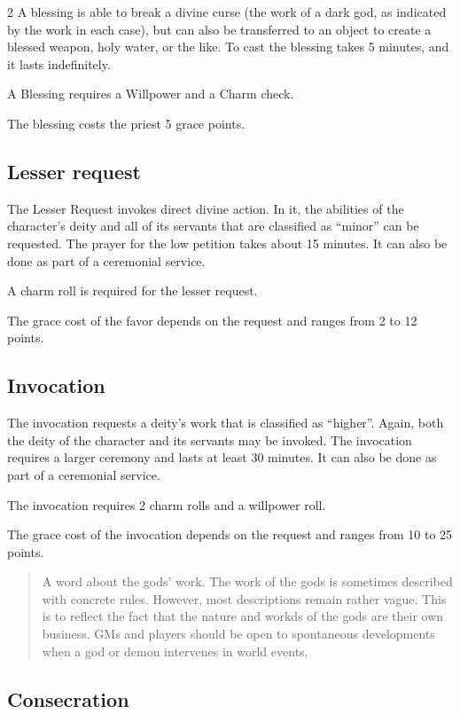 \begin{multicols}{2}
A blessing is able to break a divine curse (the work of a dark god, as indicated by the work in each case), but can also be transferred to an object to create a blessed weapon, holy water, or the like. To cast the blessing takes 5 minutes, and it lasts indefinitely.

A Blessing requires a Willpower and a Charm check.

The blessing costs the priest 5 grace points.

\subsection{Lesser request}

The Lesser Request invokes direct divine action. In it, the abilities of the character's deity and all of its servants that are classified as ``minor'' can be requested. The prayer for the low petition takes about 15 minutes. It can also be done as part of a ceremonial service.

A charm roll is required for the lesser request.

The grace cost of the favor depends on the request and ranges from 2 to 12 points.

\subsection{Invocation}

The invocation requests a deity's work that is classified as ``higher''. Again, both the deity of the character and its servants may be invoked. The invocation requires a larger ceremony and lasts at least 30 minutes. It can also be done as part of a ceremonial service.

The invocation requires 2 charm rolls and a willpower roll.

The grace cost of the invocation depends on the request and ranges from 10 to 25 points.

\begin{quote}
A word about the gods' work. The work of the gods is sometimes described with concrete rules. However, most descriptions remain rather vague. This is to reflect the fact that the nature and workds of the gods are their own business. GMs and players should be open to spontaneous developments when a god or demon intervenes in world events.
\end{quote}

\subsection{Consecration}


\end{multicols}
